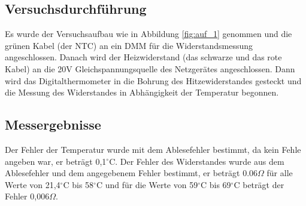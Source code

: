 \documentclass[12pt,a4paper]{article}
\begin{document}
\subsection{Versuchsdurchführung}

Es wurde der Versuchsaufbau wie in Abbildung \ref{fig:auf_1} genommen und die grünen Kabel (der NTC) an ein DMM für die Widerstandsmessung angeschlossen. Danach wird der Heizwiderstand (das schwarze und das rote Kabel) an die 20V Gleichspannungsquelle des Netzgerätes angeschlossen. Dann wird das Digitalthermometer in die Bohrung des Hitzewiderstandes gesteckt und die Messung des Widerstandes in Abhängigkeit der Temperatur begonnen.

\subsection{Messergebnisse}

Der Fehler der Temperatur wurde mit dem Ablesefehler bestimmt, da kein Fehle angeben war, er beträgt 0,1$^\circ$C. Der Fehler des Widerstandes wurde aus dem Ablesefehler und dem angegebenem Fehler bestimmt, er beträgt 0.06$\Omega$ für alle Werte von 21,4$^\circ$C bis 58$^\circ$C und für die Werte von 59$^\circ$C bis 69$^\circ$C beträgt der Fehler 0,006$\Omega$.
\end{document}
